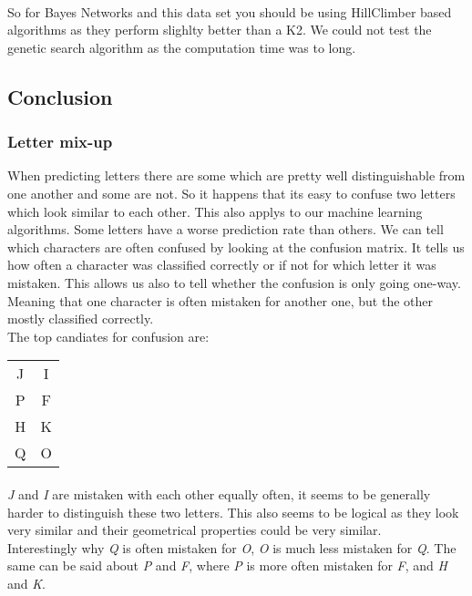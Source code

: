 \documentclass{article}
\begin{document}
\paragraph{}So for Bayes Networks and this data set you should be using HillClimber based algorithms as they perform slighlty better than a K2. We could not test the genetic search algorithm as the computation time was to long.

\subsection{Conclusion}
\subsubsection{Letter mix-up}
When predicting letters there are some which are pretty well distinguishable from one another and some are not. So it happens that its easy to confuse two letters which look similar to each other. This also applys to our machine learning algorithms. Some letters have a worse prediction rate than others. We can tell which characters are often confused by looking at the confusion matrix. It tells us how often a character was classified correctly or if not for which letter it was mistaken. This allows us also to tell whether the confusion is only going one-way. Meaning that one character is often mistaken for another one, but the other mostly classified correctly.\\
The top candiates for confusion are:\\
\begin{center}
\begin{tabular}{ c c }
\hline
J & I \\
P & F \\
H & K \\
Q & O \\
\hline
\end{tabular}
\end{center}
\paragraph{}\emph{J} and \emph{I} are mistaken with each other equally often, it seems to be generally harder to distinguish these two letters. This also seems to be logical as they look very similar and their geometrical properties could be very similar.\\
Interestingly why \emph{Q} is often mistaken for \emph{O}, \emph{O} is much less mistaken for \emph{Q}. The same can be said about \emph{P} and \emph{F}, where \emph{P} is more often mistaken for \emph{F}, and \emph{H} and \emph{K}.
\end{document}
